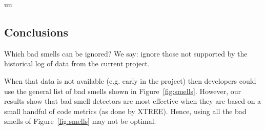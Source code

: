 uu \documentclass[final,twocolumn,5p]{elsarticle}
\newcommand{\fig}[1]{Figure~\ref{fig:#1}}
\theoremstyle{break}
\begin{document}
\begin{itemize}

  








% 


\section{Conclusions}
Which  bad smells can  be ignored? 
We say: ignore those not supported by the historical log of data from
the current project.  

When that data is not available (e.g. early
in the project) then developers could use the general list of
bad smells shown in \fig{smells}. However, 
our results
show that  bad smell detectors are most
effective when they are based
on a small handful of code metrics (as done by XTREE).
Hence, using all the bad smells of \fig{smells} may not be optimal.


\end{itemize}
\end{document}
